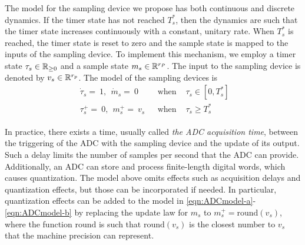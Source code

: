 \documentclass{article}
\begin{document}
\begin{enumerate}
The model for the sampling device we propose
has both continuous and discrete dynamics.
If the timer state has not reached $T^*_s$, then the dynamics are such that the timer state
increases continuously with a constant, unitary rate. When $T^*_s$ is
reached, the timer state is reset to zero and the sample state is
mapped to the inputs of the sampling device. 
To implement this mechanism, we employ a timer state 
$\tau_s \in {{\mathbb R}_{\geq 0}}$ and a sample state $m_s \in {\mathbb R}^{r_P}$.
The input to the sampling device is denoted by $v_s \in {\mathbb R}^{r_p}$. 
The model of the sampling devices is
\begin{eqnarray}\label{eqn:ADCmodel-a}
\left.
\begin{array}{l}
\dot{\tau}_s =\ 1,  \ \
\dot{m}_s  =\ 0
\end{array}
\right. & \mbox{ when }& \tau_s \in [0,T^*_s] \\ \label{eqn:ADCmodel-b}
\left.
\begin{array}{l}
\tau_s^+  =\ 0,  \ \
m_s^+ =\ v_s
\end{array}
\right. & \mbox{ when }& \tau_s \geq T^*_s
\end{eqnarray}

In practice,
there exists a time, usually called {\em the ADC acquisition time},
between the triggering of the ADC with the sampling device and the update of its output. Such a
delay limits the number of samples per second 
that the ADC can provide. 
Additionally, an ADC can store and process finite-length digital words, which causes quantization. 
The model above omits effects such as acquisition delays
and quantization effects, but those can be incorporated if needed.
In particular, quantization effects can be added to the model 
in \eqref{eqn:ADCmodel-a}-\eqref{eqn:ADCmodel-b}
by replacing the update law for $m_s$ to
$m_s^+ = \mbox{round}(v_s)$, where the function 
$\mbox{round}$ is such that $ \mbox{round}(v_s)$ is the
closest number to $v_s$ that the machine precision can represent.
\medskip


\end{enumerate}
\end{document}
